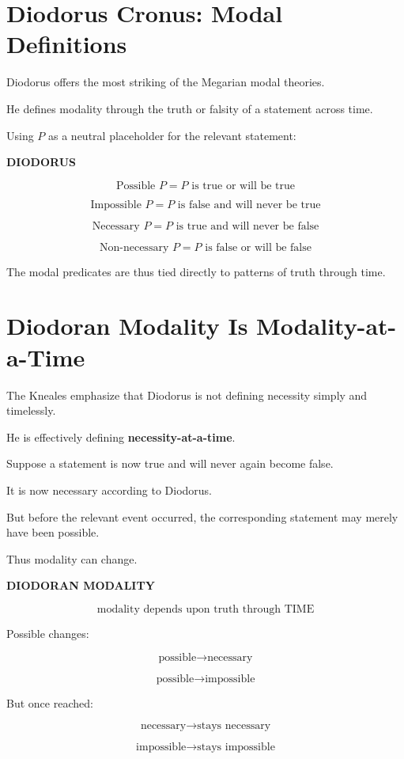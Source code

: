 \documentclass[11pt]{article}
\begin{document}
\section{Diodorus Cronus: Modal Definitions}

Diodorus offers the most striking of the Megarian modal
theories.

He defines modality through the truth or falsity of a statement
across time.

Using \(P\) as a neutral placeholder for the relevant statement:

\begin{whiteboard}
\textbf{DIODORUS}

\[
\boxed{
\text{Possible }P
=
P\text{ is true or will be true}
}
\]

\[
\boxed{
\text{Impossible }P
=
P\text{ is false and will never be true}
}
\]

\[
\boxed{
\text{Necessary }P
=
P\text{ is true and will never be false}
}
\]

\[
\boxed{
\text{Non-necessary }P
=
P\text{ is false or will be false}
}
\]
\end{whiteboard}

The modal predicates are thus tied directly to patterns of truth
through time.

\section{Diodoran Modality Is Modality-at-a-Time}

The Kneales emphasize that Diodorus is not defining necessity
simply and timelessly.

He is effectively defining \textbf{necessity-at-a-time}.

Suppose a statement is now true and will never again become
false.

It is now necessary according to Diodorus.

But before the relevant event occurred, the corresponding
statement may merely have been possible.

Thus modality can change.

\begin{whiteboard}
\textbf{DIODORAN MODALITY}

\[
\text{modality depends upon truth through TIME}
\]

Possible changes:

\[
\text{possible}
\rightarrow
\text{necessary}
\]

\[
\text{possible}
\rightarrow
\text{impossible}
\]

But once reached:

\[
\text{necessary}
\rightarrow
\text{stays necessary}
\]

\[
\text{impossible}
\rightarrow
\text{stays impossible}
\]
\end{whiteboard}
\end{document}
